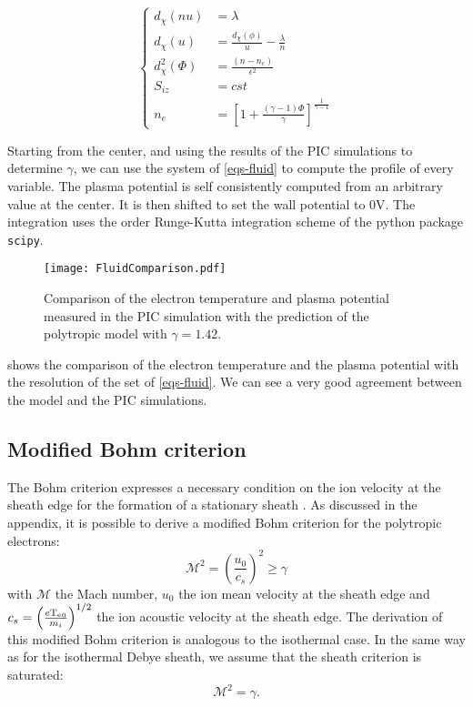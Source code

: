 \begin{equation}
  \label{eqs-fluid}
  \begin{cases}
    d_{\chi} (n u ) &= \lambda\\
    d_{\chi} (u) &= \frac{d_{\chi} (\phi)}{u} - \frac{\lambda}{n}\\
    d_{\chi}^2 (\Phi) &= \frac{(n - n_e)}{\epsilon^2}\\
    S_{iz} &= cst \\
    n_{e} &= \left[ 1 + \frac{(\gamma - 1) \Phi }{\gamma}  \right]^{\frac{1}{\gamma - 1}}
\end{cases}
\end{equation}

Starting from the center, and using the results of the PIC simulations to determine $\gamma$, we can use the system of \cref{eqs-fluid} to compute the profile of every variable.
The plasma potential is self consistently computed from an arbitrary value at the center.
It is then shifted to set the wall potential to 0V.
The integration uses the  order Runge-Kutta integration scheme of the python package \texttt{scipy}.


\begin{figure}[!htbp]
  \centering
  \texttt{[image: FluidComparison.pdf]}
  \caption{Comparison of the electron temperature and plasma potential measured in the PIC simulation with the prediction of the polytropic model with $\gamma = 1.42$.}
  \label{fig-comp}
\end{figure}

 shows the comparison of the electron temperature and the plasma potential with the resolution of the set of \cref{eqs-fluid}.
We can see a very good agreement between the model and the PIC simulations.


\subsection{Modified Bohm criterion}
The Bohm criterion expresses a necessary condition on the ion velocity at the sheath edge for the formation of a stationary sheath \citep{riemann1991}.
As discussed in the appendix, it is possible to derive a modified Bohm criterion for the polytropic electrons:
\begin{equation}
  \mathcal{M}^2 = \left( \frac{u_0}{c_s} \right)^2 \geq \gamma
\end{equation}
with $\mathcal{M}$ the Mach number, $u_0$ the ion mean velocity at the sheath edge and $c_s=\left( \frac{e \mathrm{T_e}_0}{m_i} \right)^{1/2}$ the ion acoustic velocity at the sheath edge. The derivation of this modified Bohm criterion is analogous to the isothermal case.
In the same way as for the isothermal Debye sheath, we assume that the sheath criterion is saturated:
\begin{equation}
  \label{eq-saturation}
  \mathcal{M}^2 = \gamma.
\end{equation}


